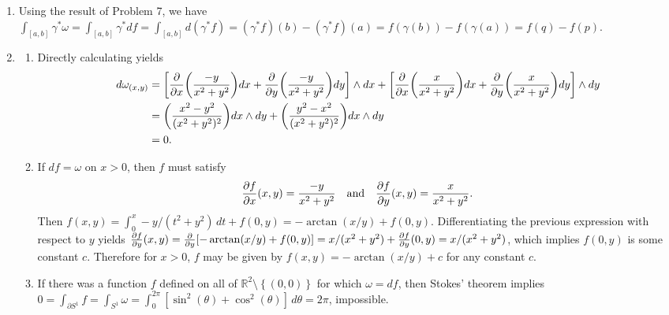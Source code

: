 \documentclass[11pt,leqno]{article}
\theoremstyle{plain}
\theoremstyle{definition}
\numberwithin{equation}{section}
\numberwithin{lem}{section}
\newcommand{\cbr}[1]{\left\{#1\right\}}
\begin{document}
\begin{enumerate}
\begin{enumerate}
      
      \item 
    \end{enumerate}
    \item Using the result of Problem 7, we have $\int_{[a,b]} \gamma^\ast\omega = \int_{[a,b]}\gamma^\ast df = \int_{[a,b]}d(\gamma^\ast f) = (\gamma^\ast f)(b) - (\gamma^\ast f)(a) = f(\gamma(b)) - f(\gamma(a)) = f(q) - f(p)$.
    \item \begin{enumerate}
      \item Directly calculating yields 
      \begin{align*}
        d\omega_{(x,y)} &= \bigg[\pdv{x}\bigg(\frac{-y}{x^2+y^2}\bigg)dx + \pdv{y}\bigg(\frac{-y}{x^2+y^2}\bigg)dy\bigg]\wedge dx + \bigg[\pdv{x}\bigg(\frac{x}{x^2+y^2}\bigg)dx + \pdv{y}\bigg(\frac{x}{x^2+y^2}\bigg)dy\bigg]\wedge dy\\
        &= \bigg(\frac{x^2-y^2}{(x^2+y^2)^2}\bigg) dx\wedge dy + \bigg(\frac{y^2-x^2}{(x^2+y^2)^2}\bigg)dx\wedge dy\\
        &= 0.
      \end{align*}
      \item If $df = \omega$ on $x>0$, then $f$ must satisfy 
      \[\pdv{f}{x}\/(x,y) = \frac{-y}{x^2+y^2} \quad\text{and}\quad \pdv{f}{y}\/(x,y) = \frac{x}{x^2+y^2}.\]
      Then $f(x,y) = \int_0^x -y/(t^2+y^2)\,dt + f(0,y) = -\arctan(x/y) + f(0,y)$. Differentiating the previous expression with respect to $y$ yields $\pdv{f}{y}\/(x,y) = \pdv{y}[-\arctan(x/y) + f(0,y)] = x/(x^2+y^2) + \pdv{f}{y}\/(0,y) = x/(x^2+y^2)$, which implies $f(0,y)$ is some constant $c$. Therefore for $x>0$, $f$ may be given by $f(x,y) = -\arctan(x/y) + c$ for any constant $c$.
      \item If there was a function $f$ defined on all of $\mathbb R^2\setminus\cbr{(0,0)}$ for which $\omega = df$, then Stokes' theorem implies $0 = \int_{\partial S^1}f = \int_{S^1}\omega = \int_0^{2\pi}[\sin^2(\theta) + \cos^2(\theta)]\,d\theta = 2\pi$, impossible.
    \end{enumerate}
\end{enumerate}
\end{document}
